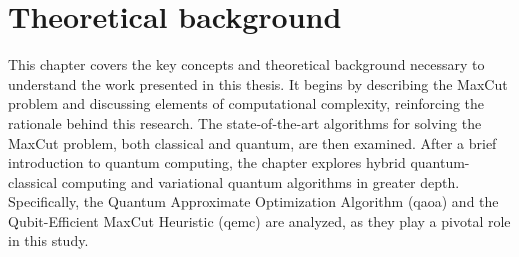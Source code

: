 \raggedbottom

\chapter{Theoretical background}
\label{chapter:Background}

This chapter covers the key concepts and theoretical background necessary to understand the work presented in this thesis. It begins by describing the MaxCut problem and discussing elements of computational complexity, reinforcing the rationale behind this research. The state-of-the-art algorithms for solving the MaxCut problem, both classical and quantum, are then examined. After a brief introduction to quantum computing, the chapter explores hybrid quantum-classical computing and variational quantum algorithms in greater depth. Specifically, the Quantum Approximate Optimization Algorithm (\acrshort{qaoa}) and the Qubit-Efficient MaxCut Heuristic (\acrshort{qemc}) are analyzed, as they play a pivotal role in this study.







